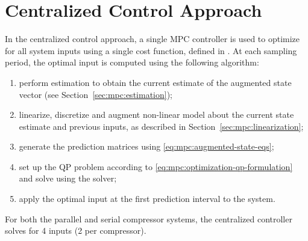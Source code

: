 \section{Centralized Control Approach}
\label{sec:mpc:centralized}

In the centralized control approach, a single MPC controller is used to optimize for all system inputs using a single cost function, defined in .
At each sampling period, the optimal input is computed using the following algorithm:

\begin{enumerate}
  \item perform estimation to obtain the current estimate of the augmented state vector (see Section~\ref{sec:mpc:estimation});
  \item linearize, discretize and augment non-linear model about the current state estimate and previous inputs, as described in Section~\ref{sec:mpc:linearization};
  \item generate the prediction matrices using \eqref{eq:mpc:augmented-state-eqs};
  \item set up the QP problem according to \eqref{eq:mpc:optimization-qp-formulation} and solve using the \qpoases{} solver;
  \item apply the optimal input at the first prediction interval to the system.
\end{enumerate}

For both the parallel and serial compressor systems, the centralized controller solves for 4 inputs (2 per compressor). 

